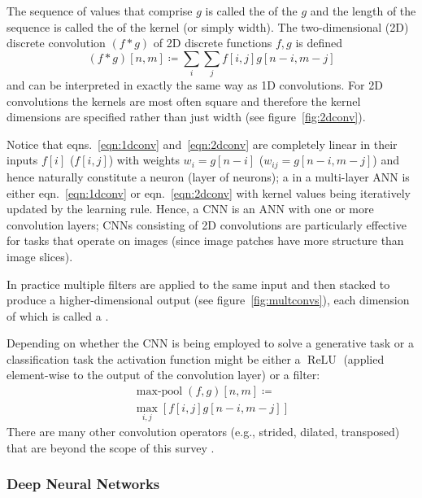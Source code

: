 %
The sequence of values that comprise \(g\) is called the  of the \(g\) and the length of the sequence is called the  of the kernel (or simply width).
%
The two-dimensional (2D) discrete convolution \((f*g)\) of 2D discrete functions \(f,g\) is defined
\begin{equation}
    (f*g)[n, m]\coloneqq \sum _{i}\sum _{j}f[i, j]g[n-i, m-j]
    \label{eqn:2dconv}
\end{equation}
and can be interpreted in exactly the same way as 1D convolutions.
%
For 2D convolutions the kernels are most often square and therefore the kernel dimensions are specified rather than just width (see figure~\ref{fig:2dconv}).


Notice that eqns.~\eqref{eqn:1dconv} and~\eqref{eqn:2dconv} are completely linear in their inputs \(f[i]\) (\(f[i,j]\)) with weights \(w_i = g[n-i]\) (\(w_{ij} = g[n-i, m-j]\)) and hence naturally constitute a neuron (layer of neurons); a  in a multi-layer ANN is either eqn.~\eqref{eqn:1dconv} or eqn.~\eqref{eqn:2dconv} with kernel values being iteratively updated by the learning rule.
%
Hence, a CNN is an ANN with one or more convolution layers; CNNs consisting of 2D convolutions are particularly effective for tasks that operate on images (since image patches have more structure than image slices).

In practice multiple filters are applied to the same input and then stacked to produce a higher-dimensional output (see figure~\ref{fig:multconvs}), each dimension of which is called a .

%
Depending on whether the CNN is being employed to solve a generative task or a classification task the activation function might be either a \(\operatorname{ReLU}\) (applied element-wise to the output of the convolution layer) or a  filter:
\begin{multline}
    \operatorname{max-pool}(f,g)[n, m]\coloneqq\\ \max_{i,j}\left[ f[i, j]g[n-i, m-j] \right]
    \label{eqn:2dpool}
\end{multline}
There are many other convolution operators (e.g., strided, dilated, transposed) that are beyond the scope of this survey \cite{dumoulin2016guide}.





\subsubsection{Deep Neural Networks}\label{subsubsec:dnns}





